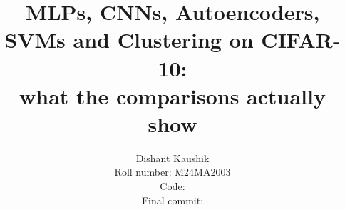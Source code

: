 \documentclass[10pt,twocolumn,letterpaper]{article}
\title{MLPs, CNNs, Autoencoders, SVMs and Clustering on CIFAR-10:\\
what the comparisons actually show}
\author{Dishant Kaushik\\
Roll number: M24MA2003\\
{\small Code: \repourl}\\
{\small Final commit: \commit}
}
\begin{document}
\maketitle








{
\small


}
\end{document}
